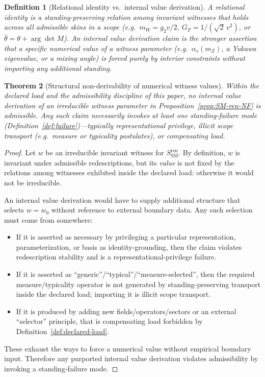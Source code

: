 \documentclass[11pt]{article}
\newtheorem{definition}{Definition}[section]
\newtheorem{theorem}[definition]{Theorem}
\theoremstyle{remark}
\newcommand{\SM}{\ensuremath{\mathrm{SM}}}
\begin{document}
\begin{definition}[Relational identity vs.\ internal value derivation]\label{def:ontic}
A \emph{relational identity} is a standing-preserving relation among invariant witnesses that holds across all
admissible skins in a scope (e.g.\ $m_W=g_2 v/2$, $G_F=1/(\sqrt2\,v^2)$, or $\bar\theta=\theta+\arg\det M$).
An \emph{internal value derivation} claim is the stronger assertion that a specific numerical value of a witness
parameter (e.g.\ $\alpha_s(m_Z)$, a Yukawa eigenvalue, or a mixing angle) is forced \emph{purely} by interior
constraints without importing any additional standing.
\end{definition}

\begin{theorem}[Structural non-derivability of numerical witness values]\label{thm:non-derivability}
Within the declared load and the admissibility discipline of this paper, no internal value derivation of an
irreducible witness parameter in Proposition~\ref{prop:SM-ren-NF} is admissible.
Any such claim necessarily invokes at least one standing-failure mode
(Definition~\ref{def:failure})---typically representational privilege, illicit scope transport (e.g.\ measure or
typicality postulates), or compensating load.
\end{theorem}

\begin{proof}
Let $w$ be an irreducible invariant witness for $S_{\SM}^{\mathrm{ren}}$.
By definition, $w$ is invariant under admissible redescriptions, but its \emph{value} is not fixed by the
relations among witnesses exhibited inside the declared load: otherwise it would not be irreducible.

An internal value derivation would have to supply additional structure that selects $w=w_0$ without reference to
external boundary data. Any such selection must come from somewhere:
\begin{itemize}[leftmargin=2.2em]
\item If it is asserted as necessary by privileging a particular representation, parameterization, or basis as
identity-grounding, then the claim violates redescription stability and is a representational-privilege failure.
\item If it is asserted as ``generic''/``typical''/``measure-selected'', then the required measure/typicality
operator is not generated by standing-preserving transport inside the declared load; importing it is illicit
scope transport.
\item If it is produced by adding new fields/operators/sectors or an external ``selector'' principle, that is
compensating load forbidden by Definition~\ref{def:declared-load}.
\end{itemize}
These exhaust the ways to force a numerical value without empirical boundary input. Therefore any purported
internal value derivation violates admissibility by invoking a standing-failure mode.
\end{proof}
\end{document}
